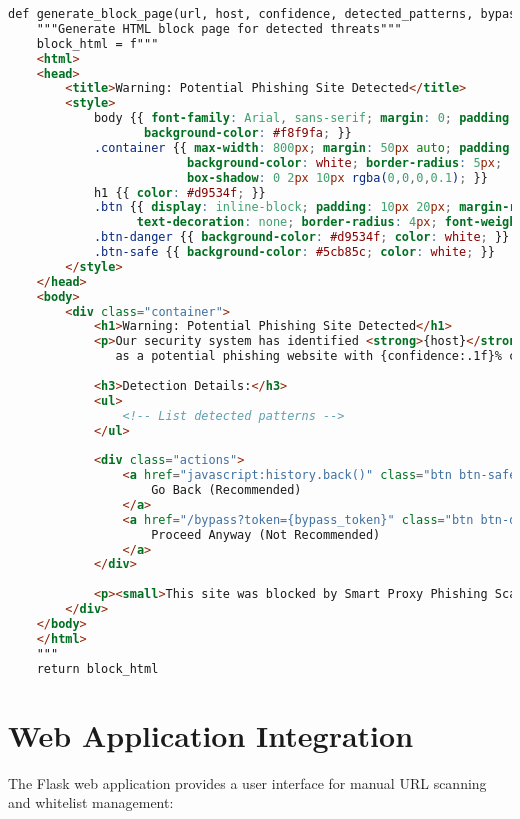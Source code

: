 \begin{lstlisting}[language=HTML, caption=Block Page Template]
def generate_block_page(url, host, confidence, detected_patterns, bypass_token):
    """Generate HTML block page for detected threats"""
    block_html = f"""
    <html>
    <head>
        <title>Warning: Potential Phishing Site Detected</title>
        <style>
            body {{ font-family: Arial, sans-serif; margin: 0; padding: 0; 
                   background-color: #f8f9fa; }}
            .container {{ max-width: 800px; margin: 50px auto; padding: 30px; 
                         background-color: white; border-radius: 5px; 
                         box-shadow: 0 2px 10px rgba(0,0,0,0.1); }}
            h1 {{ color: #d9534f; }}
            .btn {{ display: inline-block; padding: 10px 20px; margin-right: 10px;
                  text-decoration: none; border-radius: 4px; font-weight: bold; }}
            .btn-danger {{ background-color: #d9534f; color: white; }}
            .btn-safe {{ background-color: #5cb85c; color: white; }}
        </style>
    </head>
    <body>
        <div class="container">
            <h1>Warning: Potential Phishing Site Detected</h1>
            <p>Our security system has identified <strong>{host}</strong> 
               as a potential phishing website with {confidence:.1f}% confidence.</p>
            
            <h3>Detection Details:</h3>
            <ul>
                <!-- List detected patterns -->
            </ul>
            
            <div class="actions">
                <a href="javascript:history.back()" class="btn btn-safe">
                    Go Back (Recommended)
                </a>
                <a href="/bypass?token={bypass_token}" class="btn btn-danger">
                    Proceed Anyway (Not Recommended)
                </a>
            </div>
            
            <p><small>This site was blocked by Smart Proxy Phishing Scanner.</small></p>
        </div>
    </body>
    </html>
    """
    return block_html
\end{lstlisting}

\section{Web Application Integration}

The Flask web application provides a user interface for manual URL scanning and whitelist management:

